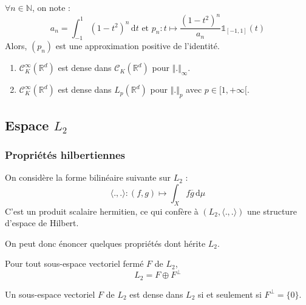 
  \begin{example}
    $\forall n \in \mathbb{N}$, on note :
    \[ a_n = \int_{-1}^1 (1-t^2)^n \, \mathrm{d}t \text{ et } p_n : t \mapsto \frac{(1-t^2)^n}{a_n} \mathbb{1}_{[-1, 1]}(t) \]
    Alors, $(p_n)$ est une approximation positive de l'identité.
  \end{example}


  \begin{application}
    \begin{enumerate}[label=(\roman*)]
      \item $\mathcal{C}^\infty_K(\mathbb{R}^d)$ est dense dans $\mathcal{C}_K(\mathbb{R}^d)$ pour $\Vert . \Vert_\infty$.
      \item $\mathcal{C}^\infty_K(\mathbb{R}^d)$ est dense dans $L_p(\mathbb{R}^d)$ pour $\Vert . \Vert_p$ avec $p \in [1, +\infty[$.
    \end{enumerate}
  \end{application}

  \subsection{Espace \texorpdfstring{$L_2$}{L₂}}

  \subsubsection{Propriétés hilbertiennes}


  \begin{definition}
    On considère la forme bilinéaire suivante sur $L_2$ :
    \[ \langle ., . \rangle : (f, g) \mapsto \int_X f \overline{g} \, \mathrm{d}\mu \]
    C'est un produit scalaire hermitien, ce qui confère à $(L_2, \langle ., . \rangle)$ une structure d'espace de Hilbert.
  \end{definition}

  On peut donc énoncer quelques propriétés dont hérite $L_2$.


  \begin{theorem}
    Pour tout sous-espace vectoriel fermé $F$ de $L_2$,
    \[ L_2 = F \oplus F^\perp \]
  \end{theorem}

  \begin{corollary}
    Un sous-espace vectoriel $F$ de $L_2$ est dense dans $L_2$ si et seulement si $F^\perp = \{ 0 \}$.
  \end{corollary}

